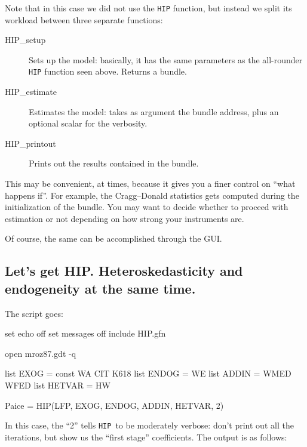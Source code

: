 \documentclass[a4paper,10pt]{article}
\newcounter{script}[section]
\newcommand{\HIP}{\texttt{HIP}}
\begin{document}
Note that in this case we did not use the \texttt{HIP} function, but
instead we split its workload between three separate functions:
\begin{description}
\item[HIP\_setup] Sets up the model: basically, it has the same
  parameters as the all-rounder \texttt{HIP} function seen
  above. Returns a bundle.
\item[HIP\_estimate] Estimates the model: takes as argument the bundle
  address, plus an optional scalar for the verbosity.
\item[HIP\_printout] Prints out the results contained in the bundle.
\end{description}

This may be convenient, at times, because it gives you a finer control
on ``what happens if''. For example, the Cragg--Donald statistics gets
computed during the initialization of the bundle. You may want to
decide whether to proceed with estimation or not depending on how
strong your instruments are.

Of course, the same can be accomplished through the GUI. 

\subsection{Let's get HIP. Heteroskedasticity and endogeneity at the
  same time.}

The script goes:
\begin{code}
set echo off 
set messages off
include HIP.gfn

open mroz87.gdt -q

list EXOG =  const WA CIT K618 
list ENDOG = WE
list ADDIN =  WMED WFED 
list HETVAR = HW 

Paice = HIP(LFP, EXOG, ENDOG, ADDIN, HETVAR, 2)
\end{code}

In this case, the ``2'' tells \HIP\ to be moderately verbose: don't
print out all the iterations, but show us the ``first stage''
coefficients. The output is as follows:
\end{document}
